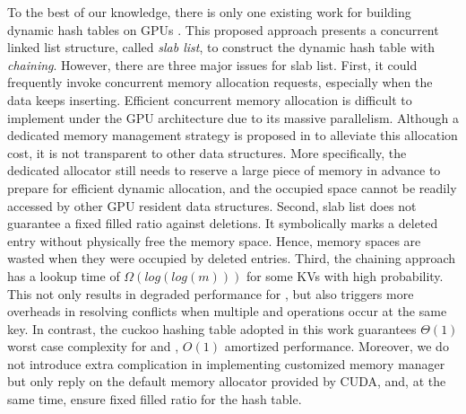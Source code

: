 To the best of our knowledge, there is only one existing work for building dynamic hash tables on GPUs \cite{ashkiani2018dynamic}.
This proposed approach presents a concurrent linked list structure, called \emph{slab list}, to construct the dynamic hash table with \emph{chaining}. 
However, there are three major issues for slab list. 
First, it could frequently invoke concurrent memory allocation requests, especially when the data keeps inserting. Efficient concurrent memory allocation is difficult to implement under the GPU architecture due to its massive parallelism. Although a dedicated memory management strategy is proposed in \cite{ashkiani2018dynamic} to alleviate this allocation cost, it is not transparent to other data structures. More specifically, the dedicated allocator still needs to reserve a large piece of memory in advance to prepare for efficient dynamic allocation, and the occupied space cannot be readily accessed by other GPU resident data structures. 
Second, slab list does not guarantee a fixed filled ratio against deletions. 
It symbolically marks a deleted entry without physically free the memory space. 
Hence, memory spaces are wasted when they were occupied by deleted entries. 
Third, the chaining approach has a lookup time of $\Omega(log(log(m)))$ for some KVs with high probability. This not only results in degraded performance for , but also triggers more overheads in resolving conflicts when multiple  and  operations occur at the same key.
In contrast, the cuckoo hashing table adopted in this work guarantees $\Theta(1)$ worst case complexity for  and , 
$O(1)$ amortized  performance. Moreover, we do not introduce extra complication in implementing customized memory manager but only reply on the default memory allocator provided by CUDA, and, at the same time, ensure fixed filled ratio for the hash table.